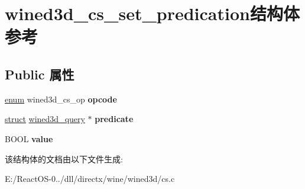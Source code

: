 \hypertarget{structwined3d__cs__set__predication}{}\section{wined3d\+\_\+cs\+\_\+set\+\_\+predication结构体 参考}
\label{structwined3d__cs__set__predication}
\subsection*{Public 属性}
\begin{DoxyCompactItemize}
\item 
\mbox{\label{structwined3d__cs__set__predication_a22bdd4716e5b9ad6d0de90d4a09071de}} 
\hyperlink{interfaceenum}{enum} wined3d\+\_\+cs\+\_\+op {\bfseries opcode}
\item 
\mbox{\label{structwined3d__cs__set__predication_ab0e505cfddab2d5bcda82b30e71328e9}} 
\hyperlink{interfacestruct}{struct} \hyperlink{structwined3d__query}{wined3d\+\_\+query} $\ast$ {\bfseries predicate}
\item 
\mbox{\label{structwined3d__cs__set__predication_a8debf0e72062eb89cf5834d85e75e8d8}} 
B\+O\+OL {\bfseries value}
\end{DoxyCompactItemize}


该结构体的文档由以下文件生成\+:\begin{DoxyCompactItemize}
\item 
E\+:/\+React\+O\+S-\/0../dll/directx/wine/wined3d/cs.\+c\end{DoxyCompactItemize}

